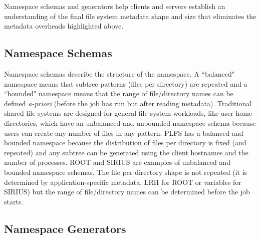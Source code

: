  


Namespace schemas and generators help clients and servers establish an
understanding of the final file system metadata shape and size that eliminates
the metadata overheads highlighted above.

\vspace{-0.5em}
\subsection{Namespace Schemas}
\label{sec:namespace-schemas}
\vspace{-0.5em}

Namespace schemas describe the structure of the namespace. A ``balanced"
namespace means that subtree patterns (files per directory) are repeated and a
``bounded" namespace means that the range of file/directory names can be
defined {\it a-priori} (before the job has run but after reading metadata).
Traditional shared file systems are designed for general file system workloads,
like user home directories, which have an unbalanced and unbounded namespace
schema because users can create any number of files in any pattern.  PLFS has a
balanced and bounded namespace because the distribution of files per directory
is fixed (and repeated) and any subtree can be generated using the client
hostnames and the number of processes.  ROOT and SIRIUS are examples of
unbalanced and bounded namespace schemas. The file per directory shape is not
repeated (it is determined by application-specific metadata, LRH for ROOT or
variables for SIRIUS) but the range of file/directory names can be determined
before the job starts.

\vspace{-0.5em}
\subsection{Namespace Generators}
\label{sec:namespace-generators}
\vspace{-0.5em}

